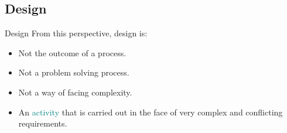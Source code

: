 \documentclass[
	11pt,
	aspectratio=169,
]{beamer}
\begin{document}
        \subsection{Design}
            \begin{frame}{Design}
                From this perspective, design is:
                \begin{itemize}
                    \item<1-> Not the outcome of a process.
                    \item<2-> Not a problem solving process.
                    \item<3-> Not a way of facing complexity.
                    \item<4-> An \textcolor{teal}{activity} that is carried out in the face of very complex and conflicting requirements.
                \end{itemize}
            \end{frame}
\end{document}
